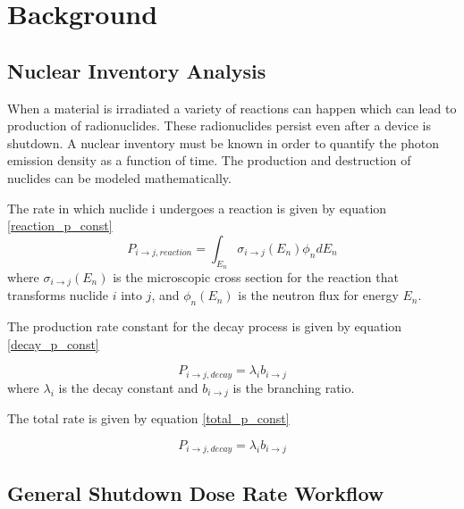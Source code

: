 \section{Background}


\subsection{Nuclear Inventory Analysis}
When a material is irradiated a variety of reactions can happen which 
can lead to production of radionuclides. These radionuclides persist 
even after a device is shutdown. A nuclear inventory must be known 
in order to quantify the photon emission density as a function of time. 
The production and destruction of nuclides can be modeled mathematically. 

The rate in which nuclide i undergoes a reaction is given by equation \ref{reaction_p_const}
\begin{equation}\label{reaction_p_const}
  P_{i \rightarrow j, reaction } = 
  \int_{E_{n}} \sigma_{i \rightarrow j}(E_{n})
  \phi_{n}dE_{n}
\end{equation}
where $\sigma_{i \rightarrow j}(E_{n})$ is the microscopic cross
section for the reaction that transforms nuclide $i$ into $j$, and
 $\phi_{n}(E_{n})$ is the neutron flux for energy $E_{n}$. 

The production rate constant for the decay process is given by equation 
\ref{decay_p_const}

\begin{equation}\label{decay_p_const}
  P_{i \rightarrow j, decay} = \lambda_{i} b_{i \rightarrow j}
\end{equation}
where $\lambda_{i}$ is the decay constant and $b_{i \rightarrow j}$ is 
the branching ratio. 

The total rate is given by equation \ref{total_p_const}

\begin{equation}\label{total_p_const}
  P_{i \rightarrow j, decay} = \lambda_{i} b_{i \rightarrow j}
\end{equation}


\subsection{General Shutdown Dose Rate Workflow}



